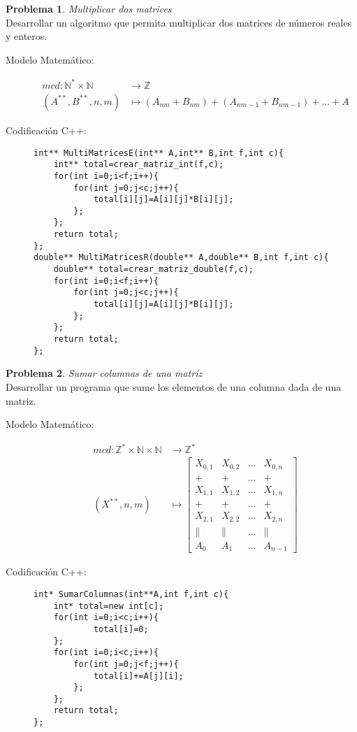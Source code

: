 \documentclass{article}
\theoremstyle{plain}
\theoremstyle{definition}
\newtheorem{problem}{Problema}
\begin{document}
\begin{problem} \emph{Multiplicar dos matrices}\\
Desarrollar un algoritmo que permita multiplicar dos matrices de números reales y enteros.
\begin{description}
\item[Modelo Matemático:]
\begin{align*}
mcd: \mathbb{N}^{*}\times\mathbb{N} &\to \mathbb{Z}\\
(A^{**},B^{**},n,m) &\mapsto
(A_{nm}+B_{nm})+(A_{nm-1}+B_{nm-1})+...+A
\end{align*}
%
\item[Codificación \textsf{C++}:]\hfill
%
\begin{verbatim}
int** MultiMatricesE(int** A,int** B,int f,int c){
    int** total=crear_matriz_int(f,c);
    for(int i=0;i<f;i++){
        for(int j=0;j<c;j++){
            total[i][j]=A[i][j]*B[i][j];
        };
    };
    return total;
};
double** MultiMatricesR(double** A,double** B,int f,int c){
    double** total=crear_matriz_double(f,c);
    for(int i=0;i<f;i++){
        for(int j=0;j<c;j++){
            total[i][j]=A[i][j]*B[i][j];
        };
    };
    return total;
};
\end{verbatim}
\end{description}
\end{problem}
\begin{problem} \emph{Sumar columnas de una matríz}\\
Desarrollar un programa que sume los elementos de una columna dada de una matriz.
\begin{description}
\item[Modelo Matemático:]
\begin{align*}
mcd: \mathbb{Z}^{*}\times\mathbb{N}\times\mathbb{N} &\to \mathbb{Z}^*\\
(X^{**},n,m) &\mapsto
\begin{bmatrix}
X_{0,1} & X_{0,2} & ... & X_{0,n} \\
+ & + & ... & +\\
X_{1,1} & X_{1,2} & ... & X_{1,n}\\
+ & + & ... & +\\
X_{2,1} & X_{2,2} & ... & X_{2,n} \\
\parallel & \parallel & ... & \parallel\\
A_{0} & A_{1} & ... & A_{n-1} 
\end{bmatrix}
\end{align*}
%
\item[Codificación \textsf{C++}:]\hfill
%
\begin{verbatim}
int* SumarColumnas(int**A,int f,int c){
    int* total=new int[c];
    for(int i=0;i<c;i++){
            total[i]=0;
    };
    for(int i=0;i<c;i++){
        for(int j=0;j<f;j++){
            total[i]+=A[j][i];
        };
    };
    return total;
};
\end{verbatim}
\end{description}
\end{problem}
\end{document}
